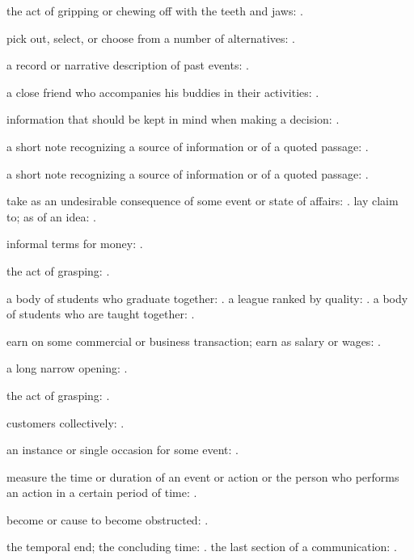   the act of gripping or chewing off with the teeth and jaws: .

  pick out, select, or choose from a number of alternatives: .

  a record or narrative description of past events: .

  a close friend who accompanies his buddies in their activities: .

  information that should be kept in mind when making a decision: .

  a short note recognizing a source of information or of a quoted passage: .

  a short note recognizing a source of information or of a quoted passage: .

  take as an undesirable consequence of some event or state of affairs: . lay claim to; as of an idea: .

  informal terms for money: .

  the act of grasping: .

  a body of students who graduate together: . a league ranked by quality: . a body of students who are taught together: .

  earn on some commercial or business transaction; earn as salary or wages: .

  a long narrow opening: .

  the act of grasping: .

  customers collectively: .

  an instance or single occasion for some event: .

  measure the time or duration of an event or action or the person who performs an action in a certain period of time: .

  become or cause to become obstructed: .

  the temporal end; the concluding time: . the last section of a communication: .

